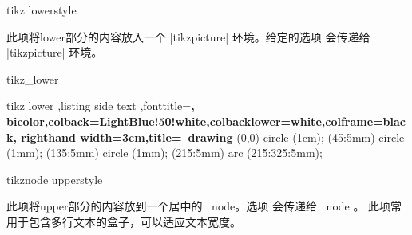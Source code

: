 \begin{docTcbKey}{tikz lower}{}{style}

此项将lower部分的内容放入一个 |tikzpicture| 环境。给定的选项  会传递给 |tikzpicture| 环境。%
\begin{exdispExample}{tikz_lower}

\begin{tcblisting}{tikz lower%
  ,listing side text%
  ,fonttitle=\bfseries,
  bicolor,colback=LightBlue!50!white,colbacklower=white,colframe=black,
  righthand width=3cm,title=\tikzname\ drawing}
\path[fill=yellow,draw=yellow!75!red]
    (0,0) circle (1cm);
\fill[red] (45:5mm) circle (1mm);
\fill[red] (135:5mm) circle (1mm);
\draw[line width=1mm,red]
    (215:5mm) arc (215:325:5mm);
\end{tcblisting}
\end{exdispExample}
\end{docTcbKey}




\begin{docTcbKey}{tikznode upper}{}{style}

此项将upper部分的内容放到一个居中的 \tikzname\  node。选项  会传递给 \tikzname\  node 。
此项常用于包含多行文本的盒子，可以适应文本宽度。
\end{docTcbKey}

